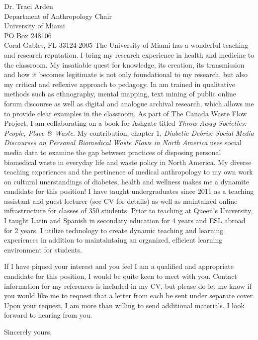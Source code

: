 \documentclass[10pt]{letter} %
\begin{document}
\begin{letter}{Dr. Traci Arden \\
Department of Anthropology Chair \\
University of Miami \\
PO Box 248106 \\
Coral Gables, FL 33124-2005}
The University of Miami has a wonderful teaching and research reputation. I bring my research experience in health and medicine to the classroom. My insatiable quest for knowledge, its creation, its transmission and how it becomes legitimate is not only foundational to my research, but also my critical and reflexive approach to pedagogy. In am trained in qualitative methods such as ethnography, mental mapping, text mining of public online forum discourse as well as digital and analogue archival research, which allows me to provide clear examples in the classroom. As part of The Canada Waste Flow Project, I am collaborating on a book for Ashgate titled \textit{Throw Away Societies: People, Place \& Waste}. My contribution, chapter 1, \textit{Diabetic Debris: Social Media Discourses on Personal Biomedical Waste Flows in North America} uses social media data to examine the gap between practices of disposing personal biomedical waste in everyday life and waste policy in North America. My diverse teaching experiences and the pertinence of medical anthropology to my own work on cultural unerstandings of diabetes, health and wellness makes me a dynamite candidate for this position! I have taught undergraduates since 2011 as a teaching assistant and guest lecturer (see CV for details) as well as maintained online infrastructure for classes of 350 students. Prior to teaching at Queen's University, I taught Latin and Spanish in secondary education for 4 years and ESL abroad for 2 years. I utilize technology to create dynamic teaching and learning experiences in addition to maintaintaing an organized, efficient learning environment for students. 

If I have piqued your interest and you feel I am a qualified and appropriate candidate for this position, I would be quite keen to meet with you. Contact information for my references is included in my CV, but please do let me know if you would like me to request that a letter from each be sent under separate cover. Upon your request, I am more than willing to send additional materials. I look forward to hearing from you.

\closing{Sincerely yours,}




\end{letter}
\end{document}
